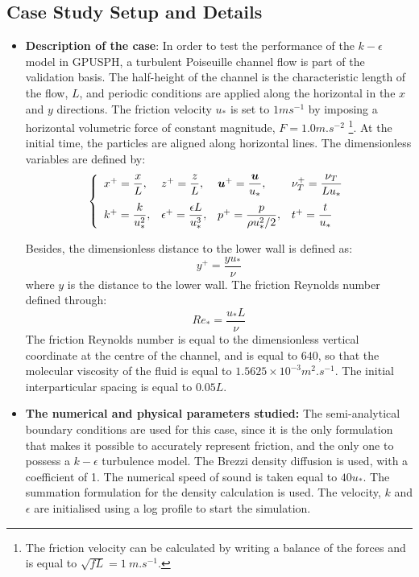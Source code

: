 \documentclass{../GPUSPHtemplate}
\begin{document}
\subsection{Case Study Setup and Details}
   
\begin{itemize}
\item \textbf{Description of the case}: 
  In order to test the performance of the $k-\epsilon$ model in GPUSPH, a turbulent Poiseuille channel flow is part of the validation basis. 
  The half-height of the channel is the characteristic length of the flow, $L$, and periodic conditions are applied along the horizontal in the $x$ and $y$ directions.
  The friction velocity $u_*$ is set to $1ms^{-1}$ by imposing a horizontal volumetric force of constant magnitude, $F = 1.0 m.s^ {-2}$%
  \footnote{The friction velocity can be calculated by writing a balance of the forces and is equal to $\sqrt{f L}=1~m.s^{-1}$.}.
  At the initial time, the particles are aligned along horizontal lines.
  The dimensionless variables are defined by:
  \begin{equation}\label{eq:dimensionlessVariables}
    \left\{
    \begin{array}{llll}
      x^+=\dfrac{x}{L}, & z^+=\dfrac{z}{L}, & \vec{u}^+=\dfrac{\vec u}{u_*}, & \nu_T^+=\dfrac{\nu_T}{L u_*}\medskip \\
      k^+=\dfrac{k}{u_*^2}, & \epsilon^+=\dfrac{\epsilon L}{u_*^3}, & p^+=\dfrac{p}{\rho u_*^2/2}, & t^+ = \dfrac{t}{u_*}
    \end{array}
    \right.
\end{equation}

  Besides, the dimensionless distance to the lower wall is defined as: 
  \begin{equation}
    y^+=\dfrac{y u_*}{\nu}
  \end{equation}
  where $y$ is the distance to the lower wall. The friction Reynolds number defined through:
  \begin{equation}
    Re_*=\dfrac{u_* L}{\nu}
  \end{equation}
  The friction Reynolds number is equal to the dimensionless vertical coordinate at the centre of the channel,
  and is equal to $640$, so that the molecular viscosity of the fluid is equal to $1.5625 \times 10^{-3}m^2.s^{-1}$. 
  The initial interparticular spacing is equal to $0.05L$. \\
  
\item \textbf{The numerical and physical parameters studied:} 
  The semi-analytical boundary conditions are used for this case, since it is the only formulation
  that makes it possible to accurately represent friction, and the only one to possess a $k-\epsilon$ turbulence
  model. The Brezzi density diffusion is used, with a coefficient of 1. The numerical speed of sound is taken equal
  to $40u_*$. The summation formulation for the density calculation is used. The velocity, $k$ and $\epsilon$
  are initialised using a log profile to start the simulation.
\end{itemize}
\end{document}
